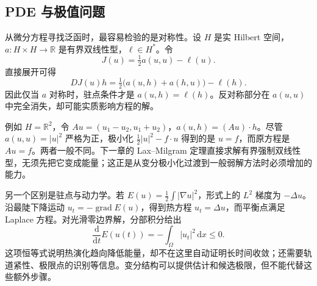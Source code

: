 \subsection{PDE 与极值问题}
\label{b2:subsec:140303}

从微分方程寻找泛函时，最容易检验的是对称性。设 \(H\) 是实 Hilbert 空间，\(a:H\times H\to\mathbb R\) 是有界双线性型，\(\ell\in H^*\)。令
\[J(u)=\tfrac12a(u,u)-\ell(u).\]
直接展开可得
\[DJ(u)h=\tfrac12\bigl(a(u,h)+a(h,u)\bigr)-\ell(h).\]
因此仅当 \(a\) 对称时，驻点条件才是 \(a(u,h)=\ell(h)\)。反对称部分在 \(a(u,u)\) 中完全消失，却可能实质影响方程的解。

\ProseParagraphBreak

例如 \(H=\mathbb R^2\)，令 \(Au=(u_1-u_2,u_1+u_2)\)，\(a(u,h)=(Au)\cdot h\)。尽管 \(a(u,u)=|u|^2\) 严格为正，极小化 \(\tfrac12|u|^2-f\cdot u\) 得到的是 \(u=f\)，而原方程是 \(Au=f\)。两者一般不同。下一章的 Lax--Milgram 定理直接求解有界强制双线性型，无须先把它变成能量；这正是从变分极小化过渡到一般弱解方法时必须增加的能力。

\ProseParagraphBreak

另一个区别是驻点与动力学。若 \(E(u)=\tfrac12\int|\nabla u|^2\)，形式上的 \(L^2\) 梯度为 \(-\Delta u\)。沿最陡下降运动 \(u_t=-\operatorname{grad}E(u)\)，得到热方程 \(u_t=\Delta u\)，而平衡点满足 Laplace 方程。对光滑零边界解，分部积分给出
\[\frac{\mathrm d}{\mathrm dt}E(u(t))=-\int_\Omega|u_t|^2\,\mathrm dx\le0.\]
这项恒等式说明热演化趋向降低能量，却不在这里自动证明长时间收敛；还需要轨道紧性、极限点的识别等信息。变分结构可以提供估计和候选极限，但不能代替这些额外步骤。
